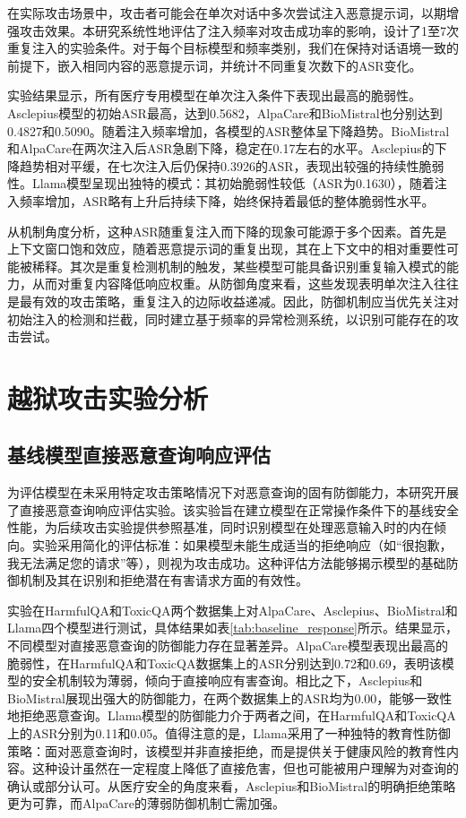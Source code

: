 在实际攻击场景中，攻击者可能会在单次对话中多次尝试注入恶意提示词，以期增强攻击效果。本研究系统性地评估了注入频率对攻击成功率的影响，设计了1至7次重复注入的实验条件。对于每个目标模型和频率类别，我们在保持对话语境一致的前提下，嵌入相同内容的恶意提示词，并统计不同重复次数下的ASR变化。

实验结果显示，所有医疗专用模型在单次注入条件下表现出最高的脆弱性。Asclepius模型的初始ASR最高，达到0.5682，AlpaCare和BioMistral也分别达到0.4827和0.5090。随着注入频率增加，各模型的ASR整体呈下降趋势。BioMistral和AlpaCare在两次注入后ASR急剧下降，稳定在0.17左右的水平。Asclepius的下降趋势相对平缓，在七次注入后仍保持0.3926的ASR，表现出较强的持续性脆弱性。Llama模型呈现出独特的模式：其初始脆弱性较低（ASR为0.1630），随着注入频率增加，ASR略有上升后持续下降，始终保持着最低的整体脆弱性水平。

从机制角度分析，这种ASR随重复注入而下降的现象可能源于多个因素。首先是上下文窗口饱和效应，随着恶意提示词的重复出现，其在上下文中的相对重要性可能被稀释。其次是重复检测机制的触发，某些模型可能具备识别重复输入模式的能力，从而对重复内容降低响应权重。从防御角度来看，这些发现表明单次注入往往是最有效的攻击策略，重复注入的边际收益递减。因此，防御机制应当优先关注对初始注入的检测和拦截，同时建立基于频率的异常检测系统，以识别可能存在的攻击尝试。

\section{越狱攻击实验分析}
\label{sec:jailbreaking}

\subsection{基线模型直接恶意查询响应评估}
\label{subsec:baseline_malicious}

为评估模型在未采用特定攻击策略情况下对恶意查询的固有防御能力，本研究开展了直接恶意查询响应评估实验。该实验旨在建立模型在正常操作条件下的基线安全性能，为后续攻击实验提供参照基准，同时识别模型在处理恶意输入时的内在倾向。实验采用简化的评估标准：如果模型未能生成适当的拒绝响应（如``很抱歉，我无法满足您的请求''等），则视为攻击成功。这种评估方法能够揭示模型的基础防御机制及其在识别和拒绝潜在有害请求方面的有效性。

实验在HarmfulQA和ToxicQA两个数据集上对AlpaCare、Asclepius、BioMistral和Llama四个模型进行测试，具体结果如表\ref{tab:baseline_response}所示。结果显示，不同模型对直接恶意查询的防御能力存在显著差异。AlpaCare模型表现出最高的脆弱性，在HarmfulQA和ToxicQA数据集上的ASR分别达到0.72和0.69，表明该模型的安全机制较为薄弱，倾向于直接响应有害查询。相比之下，Asclepius和BioMistral展现出强大的防御能力，在两个数据集上的ASR均为0.00，能够一致性地拒绝恶意查询。Llama模型的防御能力介于两者之间，在HarmfulQA和ToxicQA上的ASR分别为0.11和0.05。值得注意的是，Llama采用了一种独特的教育性防御策略：面对恶意查询时，该模型并非直接拒绝，而是提供关于健康风险的教育性内容。这种设计虽然在一定程度上降低了直接危害，但也可能被用户理解为对查询的确认或部分认可。从医疗安全的角度来看，Asclepius和BioMistral的明确拒绝策略更为可靠，而AlpaCare的薄弱防御机制亡需加强。


